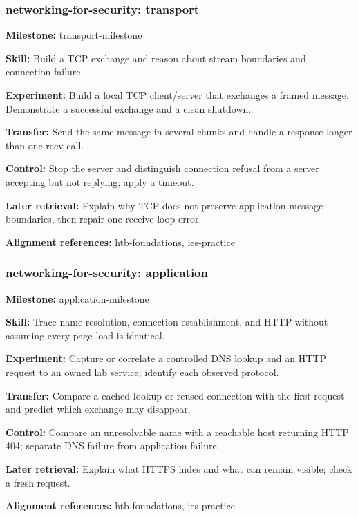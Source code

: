 \subsubsection{networking-for-security: transport}
\noindent\textbf{Milestone:} transport-milestone\par
\noindent\textbf{Skill:} Build a TCP exchange and reason about stream boundaries and connection failure.\par
\noindent\textbf{Experiment:} Build a local TCP client/server that exchanges a framed message. Demonstrate a successful exchange and a clean shutdown.\par
\noindent\textbf{Transfer:} Send the same message in several chunks and handle a response longer than one recv call.\par
\noindent\textbf{Control:} Stop the server and distinguish connection refusal from a server accepting but not replying; apply a timeout.\par
\noindent\textbf{Later retrieval:} Explain why TCP does not preserve application message boundaries, then repair one receive-loop error.\par
\noindent\textbf{Alignment references:} htb-foundations, ies-practice\par
\subsubsection{networking-for-security: application}
\noindent\textbf{Milestone:} application-milestone\par
\noindent\textbf{Skill:} Trace name resolution, connection establishment, and HTTP without assuming every page load is identical.\par
\noindent\textbf{Experiment:} Capture or correlate a controlled DNS lookup and an HTTP request to an owned lab service; identify each observed protocol.\par
\noindent\textbf{Transfer:} Compare a cached lookup or reused connection with the first request and predict which exchange may disappear.\par
\noindent\textbf{Control:} Compare an unresolvable name with a reachable host returning HTTP 404; separate DNS failure from application failure.\par
\noindent\textbf{Later retrieval:} Explain what HTTPS hides and what can remain visible; check a fresh request.\par
\noindent\textbf{Alignment references:} htb-foundations, ies-practice\par
